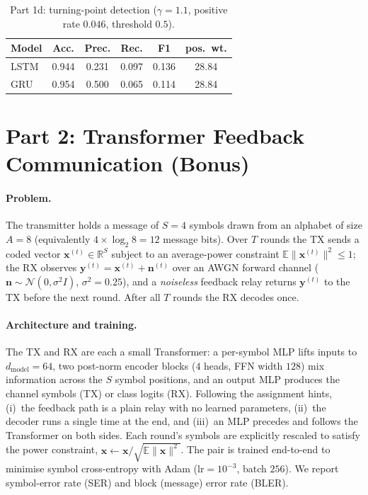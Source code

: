 \documentclass[10pt,twocolumn]{article}
\begin{document}
\begin{table}[t]
\centering
\caption{Part 1d: turning-point detection ($\gamma{=}1.1$, positive rate
$0.046$, threshold $0.5$).}
\label{tab:turning}
\begin{tabular}{lccccc}
\toprule
Model & Acc. & Prec. & Rec. & F1 & pos.\ wt. \\
\midrule
LSTM & 0.944 & 0.231 & 0.097 & 0.136 & 28.84 \\
GRU  & 0.954 & 0.500 & 0.065 & 0.114 & 28.84 \\
\bottomrule
\end{tabular}
\end{table}

\section{Part 2: Transformer Feedback Communication (Bonus)}
\paragraph{Problem.} The transmitter holds a message of $S{=}4$ symbols drawn
from an alphabet of size $A{=}8$ (equivalently $4\times\log_2 8 = 12$ message
bits). Over $T$ rounds the TX sends a coded vector $\mathbf{x}^{(t)}\!\in\!
\mathbb{R}^{S}$ subject to an average-power constraint
$\mathbb{E}\lVert\mathbf{x}^{(t)}\rVert^2\le 1$; the RX observes
$\mathbf{y}^{(t)}=\mathbf{x}^{(t)}+\mathbf{n}^{(t)}$ over an AWGN forward channel
($\mathbf{n}\sim\mathcal{N}(0,\sigma^2 I)$, $\sigma^2{=}0.25$), and a
\emph{noiseless} feedback relay returns $\mathbf{y}^{(t)}$ to the TX before the
next round. After all $T$ rounds the RX decodes once.

\paragraph{Architecture and training.} The TX and RX are each a small
Transformer: a per-symbol MLP lifts inputs to $d_{\text{model}}{=}64$, two
post-norm encoder blocks ($4$ heads, FFN width $128$) mix information across the
$S$ symbol positions, and an output MLP produces the channel symbols (TX) or class
logits (RX). Following the assignment hints, (i)~the feedback path is a plain
relay with no learned parameters, (ii)~the decoder runs a single time at the end,
and (iii)~an MLP precedes and follows the Transformer on both sides. Each round's
symbols are explicitly rescaled to satisfy the power constraint,
$\mathbf{x}\leftarrow\mathbf{x}/\sqrt{\mathbb{E}\lVert\mathbf{x}\rVert^2}$. The
pair is trained end-to-end to minimise symbol cross-entropy with Adam
($\text{lr}=10^{-3}$, batch $256$). We report symbol-error rate (SER) and block
(message) error rate (BLER).
\end{document}
